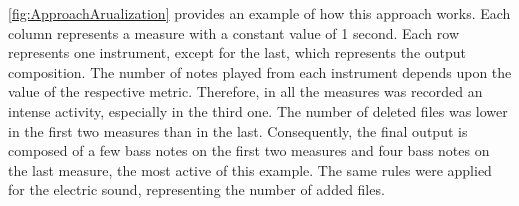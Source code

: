 \autoref{fig:ApproachArualization} provides an example of how this approach works. Each column represents a measure with a constant value of 1 second. Each row represents one instrument, except for the last, which represents the output composition. The number of notes played from each instrument depends upon the value of the respective metric. Therefore, in all the measures was recorded an intense activity, especially in the third one. The number of deleted files was lower in the first two measures than in the last. Consequently, the final output is composed of a few bass notes on the first two measures and four bass notes on the last measure, the most active of this example. The same rules were applied for the electric sound, representing the number of added files.    
